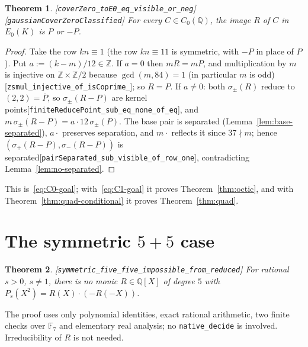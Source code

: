 \documentclass[10pt]{article}
\newtheorem{theorem}{Theorem}[section]
\theoremstyle{definition}
\theoremstyle{remark}
\newcommand{\Q}{\mathbb{Q}}
\newcommand{\Z}{\mathbb{Z}}
\newcommand{\F}{\mathbb{F}}
\newcommand{\leanref}[1]{{\scriptsize\textup{[\texttt{#1}]}}\allowbreak}
\begin{document}
\begin{theorem}\label{thm:C0}
\leanref{cover\allowbreak Zero\_\allowbreak to\allowbreak E0\_\allowbreak eq\_\allowbreak visible\_\allowbreak or\_\allowbreak neg} \leanref{gaussian\allowbreak Cover\allowbreak Zero\allowbreak Classified}
For every $C\in C_0(\Q)$, the image $R$ of $C$ in $E_0(K)$ is $P$ or $-P$.
\end{theorem}
\begin{proof}
Take the row $kn\equiv1$ (the row $kn\equiv11$ is symmetric, with $-P$ in place
of $P$).  Put $a:=(k-m)/12\in\Z$.  If $a=0$ then $mR=mP$, and multiplication
by $m$ is injective on $\Z\times\Z/2$ because $\gcd(m,84)=1$ (in particular $m$
is odd)\leanref{zsmul\_\allowbreak injective\_\allowbreak of\_\allowbreak is\allowbreak Coprime\_\allowbreak 84}; so $R=P$.  If $a\ne0$: both
$\sigma_\pm(R)$ reduce to $(2,2)=\overline{P}$, so $\sigma_\pm(R-P)$ are kernel
points\leanref{finite\allowbreak Reduce\allowbreak Point\_\allowbreak sub\_\allowbreak eq\_\allowbreak none\_\allowbreak of\_\allowbreak eq}, and
$m\,\sigma_\pm(R-P)=a\cdot12\,\sigma_\pm(P)$.  The base pair is separated
(Lemma~\ref{lem:base-separated}), $a\cdot$ preserves separation, and $m\cdot$
reflects it since $37\nmid m$; hence $(\sigma_+(R-P),\sigma_-(R-P))$ is
separated\leanref{pair\allowbreak Separated\_\allowbreak sub\_\allowbreak visible\_\allowbreak of\_\allowbreak row\_\allowbreak one}, contradicting
Lemma~\ref{lem:no-separated}.
\end{proof}

This is~\eqref{eq:C0-goal}; with~\eqref{eq:C1-goal} it proves
Theorem~\ref{thm:octic}, and with Theorem~\ref{thm:quad-conditional} it proves
Theorem~\ref{thm:quad}.
\section{The symmetric \texorpdfstring{$5+5$}{5+5} case}\label{sec:fivefive}

\begin{theorem}\label{thm:fivefive}
\leanref{symmetric\_\allowbreak five\_\allowbreak five\_\allowbreak impossible\_\allowbreak from\_\allowbreak reduced}
For rational $s>0$, $s\ne1$, there is no monic $R\in\Q[X]$ of degree $5$ with
$P_s(X^2)=R(X)\cdot(-R(-X))$.
\end{theorem}
The proof uses only polynomial identities, exact rational arithmetic, two
finite checks over $\F_7$ and elementary real analysis; no
\texttt{native\_\allowbreak decide} is involved.  Irreducibility of $R$ is not needed.
\end{document}
